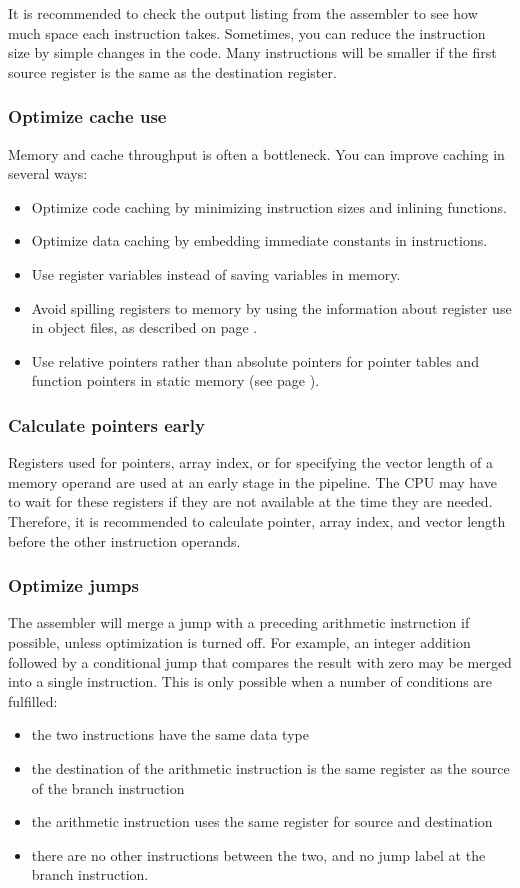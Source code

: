 \documentclass[forwardcom.tex]{subfiles}
\begin{document}
It is recommended to check the output listing from the assembler to see 
how much space each instruction takes. Sometimes, you can reduce the instruction size by simple changes in the code. Many instructions will be smaller if the first source register is the same as the destination register. 
\vv


\subsubsection{Optimize cache use}
Memory and cache throughput is often a bottleneck. You can improve caching 
in several ways:

\begin{itemize}
\item Optimize code caching by minimizing instruction sizes and inlining functions.
\item Optimize data caching by embedding immediate constants in instructions.
\item Use register variables instead of saving variables in memory.
\item Avoid spilling registers to memory by using the information about register use in object files, as described on page \pageref{chap:registerUsageConvention}.
\item Use relative pointers rather than absolute pointers for pointer tables and function pointers in static memory (see page \pageref{relativeDataPointer}).
\end{itemize}
\vv

\subsubsection{Calculate pointers early}
Registers used for pointers, array index, or for specifying the vector length of a memory operand are used at an early stage in the pipeline. The CPU may have to wait for these registers if they are not available at the time they are needed. Therefore, it is recommended to calculate pointer, array index, and vector length before the other instruction operands.
\vv

\subsubsection{Optimize jumps}
The assembler will merge a jump with a preceding arithmetic instruction if possible, unless optimization is turned off. For example, an integer addition followed by a conditional jump that compares the result with zero may be merged into a single instruction. This is only possible when a number of conditions are fulfilled: 
\begin{itemize}
\item the two instructions have the same data type
\item the destination of the arithmetic instruction is the same register as the source of the branch instruction
\item the arithmetic instruction uses the same register for source and destination
\item there are no other instructions between the two, and no jump label at the branch instruction.
\end{itemize}
\end{document}
